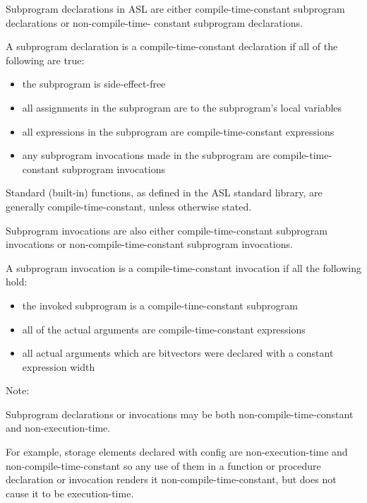 \documentclass{book}
\begin{document}
Subprogram declarations in ASL are either compile-time-constant subprogram declarations or non-compile-time- constant subprogram declarations.


A subprogram declaration is a compile-time-constant declaration if all of the following are true:
\begin{itemize}
\item the subprogram is side-effect-free
\item all assignments in the subprogram are to the subprogram’s local
variables
\item all expressions in the subprogram are compile-time-constant
expressions
\item any subprogram invocations made in the subprogram are
compile-time-constant subprogram invocations
\end{itemize}


Standard (built-in) functions, as defined in the ASL standard library, are
generally compile-time-constant, unless otherwise stated.


Subprogram invocations are also either compile-time-constant subprogram
invocations or non-compile-time-constant subprogram invocations.


A subprogram invocation is a compile-time-constant invocation if all the
following hold:
\begin{itemize}
\item the invoked subprogram is a compile-time-constant subprogram
\item all of the actual arguments are compile-time-constant expressions
\item all actual arguments which are bitvectors were declared with a constant
expression width
\end{itemize}

Note:

Subprogram declarations or invocations may be both non-compile-time-constant
and non-execution-time.

For example, storage elements declared with config are non-execution-time and
non-compile-time-constant so any use of them in a function or procedure
declaration or invocation renders it non-compile-time-constant, but does not
cause it to be execution-time.
\end{document}
